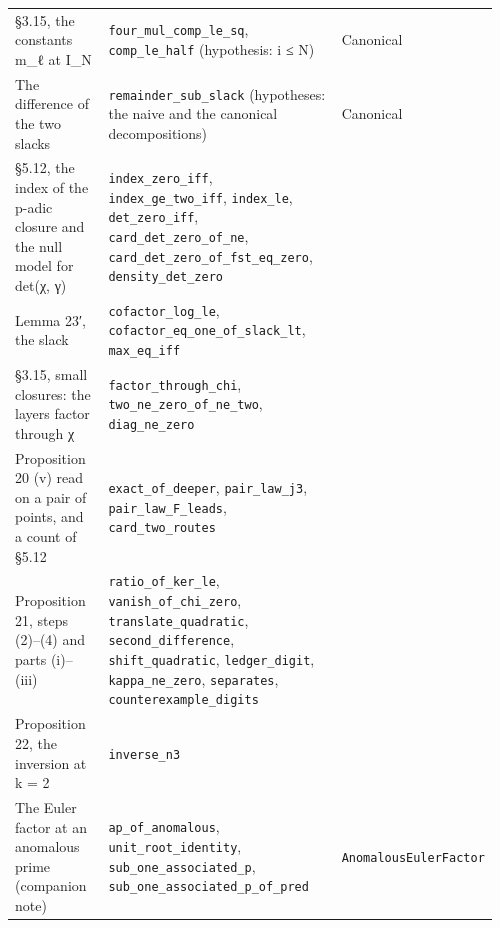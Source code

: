 \documentclass[11pt,a4paper]{article}
\theoremstyle{named}
\begin{document}
\begin{small}
\begin{longtable}{>{\raggedright\arraybackslash}p{0.242\linewidth}>{\raggedright\arraybackslash}p{0.574\linewidth}>{\raggedright\arraybackslash}p{0.143\linewidth}}
§3.15, the constants m\_ℓ at I\_N & \texttt{four\_\allowbreak{}mul\_\allowbreak{}comp\_\allowbreak{}le\_\allowbreak{}sq}, \texttt{comp\_\allowbreak{}le\_\allowbreak{}half} (hypothesis: i ≤ N) & Canonical \\
The difference of the two slacks & \texttt{remainder\_\allowbreak{}sub\_\allowbreak{}slack} (hypotheses: the naive and the canonical decompositions) & Canonical \\
§5.12, the index of the p-adic closure and the null model for det(χ, γ) & \texttt{index\_\allowbreak{}zero\_\allowbreak{}iff}, \texttt{index\_\allowbreak{}ge\_\allowbreak{}two\_\allowbreak{}iff}, \texttt{index\_\allowbreak{}le}, \texttt{det\_\allowbreak{}zero\_\allowbreak{}iff}, \texttt{card\_\allowbreak{}det\_\allowbreak{}zero\_\allowbreak{}of\_\allowbreak{}ne}, \texttt{card\_\allowbreak{}det\_\allowbreak{}zero\_\allowbreak{}of\_\allowbreak{}fst\_\allowbreak{}eq\_\allowbreak{}zero}, \texttt{density\_\allowbreak{}det\_\allowbreak{}zero} & 27 \\
Lemma 23′, the slack & \texttt{cofactor\_\allowbreak{}log\_\allowbreak{}le}, \texttt{cofactor\_\allowbreak{}eq\_\allowbreak{}one\_\allowbreak{}of\_\allowbreak{}slack\_\allowbreak{}lt}, \texttt{max\_\allowbreak{}eq\_\allowbreak{}iff} & 28 \\
§3.15, small closures: the layers factor through χ & \texttt{factor\_\allowbreak{}through\_\allowbreak{}chi}, \texttt{two\_\allowbreak{}ne\_\allowbreak{}zero\_\allowbreak{}of\_\allowbreak{}ne\_\allowbreak{}two}, \texttt{diag\_\allowbreak{}ne\_\allowbreak{}zero} & 28 \\
Proposition 20 (v) read on a pair of points, and a count of §5.12 & \texttt{exact\_\allowbreak{}of\_\allowbreak{}deeper}, \texttt{pair\_\allowbreak{}law\_\allowbreak{}j3}, \texttt{pair\_\allowbreak{}law\_\allowbreak{}F\_\allowbreak{}leads}, \texttt{card\_\allowbreak{}two\_\allowbreak{}routes} & 28 \\
Proposition 21, steps (2)–(4) and parts (i)–(iii) & \texttt{ratio\_\allowbreak{}of\_\allowbreak{}ker\_\allowbreak{}le}, \texttt{vanish\_\allowbreak{}of\_\allowbreak{}chi\_\allowbreak{}zero}, \texttt{translate\_\allowbreak{}quadratic}, \texttt{second\_\allowbreak{}difference}, \texttt{shift\_\allowbreak{}quadratic}, \texttt{ledger\_\allowbreak{}digit}, \texttt{kappa\_\allowbreak{}ne\_\allowbreak{}zero}, \texttt{separates}, \texttt{counterexample\_\allowbreak{}digits} & 29 \\
Proposition 22, the inversion at k = 2 & \texttt{inverse\_\allowbreak{}n3} & 29 \\
The Euler factor at an anomalous prime (companion note) & \texttt{ap\_\allowbreak{}of\_\allowbreak{}anomalous}, \texttt{unit\_\allowbreak{}root\_\allowbreak{}identity}, \texttt{sub\_\allowbreak{}one\_\allowbreak{}associated\_\allowbreak{}p}, \texttt{sub\_\allowbreak{}one\_\allowbreak{}associated\_\allowbreak{}p\_\allowbreak{}of\_\allowbreak{}pred} & \texttt{AnomalousEulerFactor} \\
\hline
\end{longtable}
\end{small}
\end{document}
